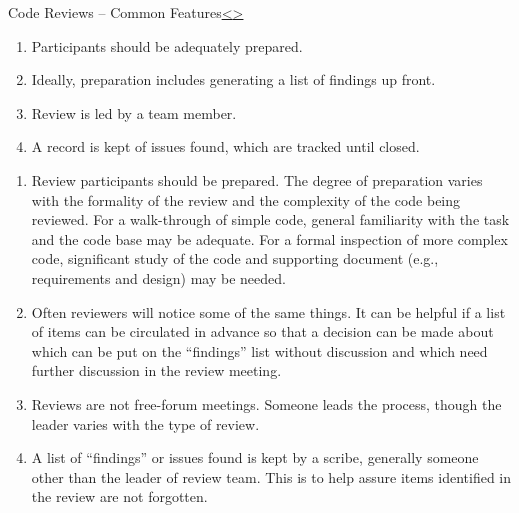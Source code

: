 \documentclass[12pt]{extarticle}
\newenvironment{instructionblock}{\Large\bgroup}{\egroup}
\begin{document}
\pagebreak
\begin{slide}{Code Reviews -- Common Features}{\hyperref[slide 12]{\textless}\hyperref[slide 14]{\textgreater}}
	\vskip 10pt
	\begin{instructionblock}
	\begin{enumerate}
	\item Participants should be adequately prepared.
	\item Ideally, preparation includes generating a list of findings up front.\cite{CodeInspection}
	\item Review is led by a team member.\cite{TechnicalReview}
	\item A record is kept of issues found, which are tracked until closed.\cite{CodeWalkthrough}
	\end{enumerate}
	
	\end{instructionblock}
\end{slide}
\begin{enumerate}
\item Review participants should be prepared.  The degree of preparation varies with the formality of the review and the complexity of the code being reviewed.  For a walk-through\cite{CodeWalkthrough} of simple code, general familiarity with the task and the code base may be adequate.  For a formal inspection of more complex code, significant study of the code and supporting document (e.g., requirements and design) may be needed.

\item Often reviewers will notice some of the same things.  It can be helpful if a list of items can be circulated in advance so that a decision can be made about which can be put on the ``findings'' list without discussion and which need further discussion in the review meeting.\cite{CodeInspection}

\item Reviews are not free-forum meetings.  Someone leads the process, though the leader varies with the type of review.

\item A list of ``findings'' or issues found is kept by a scribe, generally someone other than the leader of review team. This is to help assure items identified in the review are not forgotten.\cite{TechnicalReview}
\end{enumerate}



\end{document}
